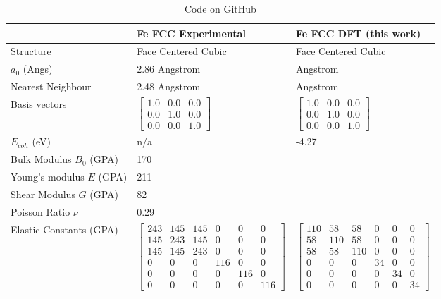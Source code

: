 \renewcommand{\arraystretch}{1.7}
\begin{table}[ht]
\begin{tabular}{lll}
\hline
& Fe FCC Experimental & Fe FCC DFT (this work)  \\
\hline
Structure                    & Face Centered Cubic & Face Centered Cubic  \\
$a_0$ (Angs)                 & 2.86 Angstrom &  Angstrom \\
Nearest Neighbour            & 2.48 Angstrom &  Angstrom \\
Basis vectors                & $\begin{bmatrix} 1.0 & 0.0 & 0.0 \\ 0.0 & 1.0 & 0.0 \\ 0.0 & 0.0 & 1.0 \end{bmatrix}$ & $\begin{bmatrix} 1.0 & 0.0 & 0.0 \\ 0.0 & 1.0 & 0.0 \\ 0.0 & 0.0 & 1.0 \end{bmatrix}$ \\
$E_{coh}$ (eV)               & n/a &  -4.27 \\
Bulk Modulus $B_0$ (GPA)     & 170  &  \\
Young's modulus $E$ (GPA)    & 211  &  \\
Shear Modulus $G$ (GPA)      & 82  &  \\
Poisson Ratio $\nu$          & 0.29  &  \\
Elastic Constants (GPA)      & $\begin{bmatrix} 243 & 145 & 145 & 0 & 0 & 0 \\ 145 & 243 & 145 & 0 & 0 & 0 \\ 145 & 145 & 243 & 0 & 0 & 0 \\ 0 & 0 & 0 & 116 & 0 & 0 \\ 0 & 0 & 0 & 0 & 116 & 0 \\ 0 & 0 & 0 & 0 & 0 & 116 \end{bmatrix}$ & $\begin{bmatrix} 110 & 58 & 58 & 0 & 0 & 0 \\ 58 & 110 & 58 & 0 & 0 & 0 \\ 58 & 58 & 110 & 0 & 0 & 0 \\ 0 & 0 & 0 & 34 & 0 & 0 \\ 0 & 0 & 0 & 0 & 34 & 0 \\ 0 & 0 & 0 & 0 & 0 & 34 \end{bmatrix}$ \\
\end{tabular}
\label{tab:multicol}
\caption{Code on GitHub}
\end{table}



